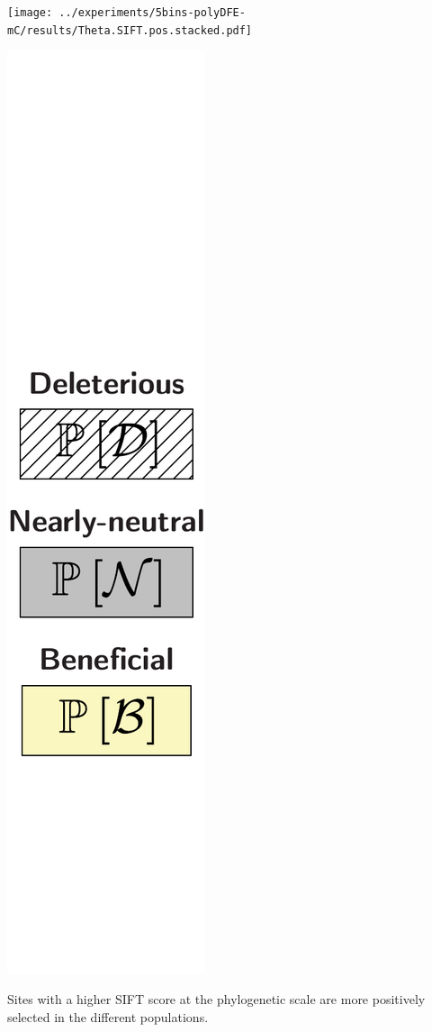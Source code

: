 \documentclass{article}
\begin{document}
\begin{center}
\begin{minipage}{0.09\linewidth}
        \end{minipage}
        \begin{minipage}{0.9\linewidth}
            \texttt{[image: ../experiments/5bins-polyDFE-mC/results/Theta.SIFT.pos.stacked.pdf]}
        \end{minipage}
        \begin{minipage}{0.09\linewidth}
            \includegraphics[width=\linewidth, page=1]{artworks/legend.polycat}
        \end{minipage}
    \end{center}
    Sites with a higher SIFT score at the phylogenetic scale are more positively selected in the different populations.
\end{document}
